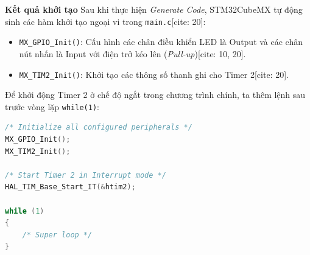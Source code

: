 \textbf{Kết quả khởi tạo}
Sau khi thực hiện \textit{Generate Code}, STM32CubeMX tự động sinh các hàm khởi tạo ngoại vi trong \texttt{main.c}[cite: 20]:
\begin{itemize}
    \item \texttt{MX\_GPIO\_Init()}: Cấu hình các chân điều khiển LED là Output và các chân nút nhấn là Input với điện trở kéo lên (\textit{Pull-up})[cite: 10, 20].
    \item \texttt{MX\_TIM2\_Init()}: Khởi tạo các thông số thanh ghi cho Timer 2[cite: 20].
\end{itemize}

Để khởi động Timer 2 ở chế độ ngắt trong chương trình chính, ta thêm lệnh sau trước vòng lặp \texttt{while(1)}:

\begin{lstlisting}[language=C, caption={Khởi động ngắt Timer 2 trong main.c}]
/* Initialize all configured peripherals */
MX_GPIO_Init();
MX_TIM2_Init();

/* Start Timer 2 in Interrupt mode */
HAL_TIM_Base_Start_IT(&htim2);

while (1)
{
    /* Super loop */
}
\end{lstlisting}

